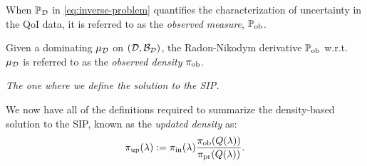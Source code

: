 \begin{frame}

\begin{defn}\label{defn:observed}
When $\mathbb{P}_{\mathcal{D}}$ in \eqref{eq:inverse-problem} quantifies the characterization of uncertainty in the QoI data, it is referred to as the \emph{observed measure}, $\operatorname*{\mathbb{P}_{ob}}$.
\bigskip

Given a dominating $\mu_{\mathcal{D}}$ on $(\mathcal{D}, \mathcal{B}_{\mathcal{D}})$, the Radon-Nikodym derivative $\operatorname*{\mathbb{P}_{ob}}$ w.r.t. $\mu_{\mathcal{D}}$ is referred to as the  \emph{observed density} $\operatorname*{\pi_{ob}}$.
\end{defn}

\end{frame}


\begin{frame}{\it The one where we define the solution to the SIP.}

We now have all of the definitions required to summarize the density-based solution to the SIP, known as the \emph{updated density} as:
\vskip 10pt
\begin{equation}\label{eq:updated-pdf}
	\operatorname*{\pi_{up}}(\lambda) := \operatorname*{\pi_{in}}(\lambda)\frac{\operatorname*{\pi_{ob}}(Q(\lambda))}{\operatorname*{\pi_{pr}}(Q(\lambda))}.
\end{equation}

\end{frame}

